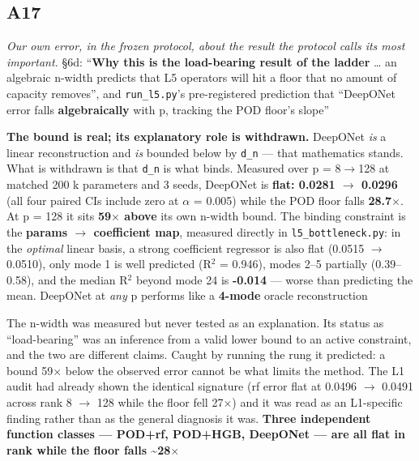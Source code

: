 \documentclass[10pt]{article}
\begin{document}
\subsection*{A17}\label{led:A17}
\begin{description}[leftmargin=0pt,itemsep=1pt]
\item[Claim withdrawn.] \emph{Our own error, in the frozen protocol, about the result the protocol calls its most important.} §6d: ``\textbf{Why this is the load-bearing result of the ladder} \ldots{} an algebraic n-width predicts that L5 operators will hit a floor that no amount of capacity removes'', and \texttt{run\_l5.py}'s pre-registered prediction that ``DeepONet error falls \textbf{algebraically} with p, tracking the POD floor's slope''
\item[Replaced with.] \textbf{The bound is real; its explanatory role is withdrawn.} DeepONet \emph{is} a linear reconstruction and \emph{is} bounded below by \texttt{d\_n} --- that mathematics stands. What is withdrawn is that \texttt{d\_n} is what binds. Measured over p = 8$\rightarrow$128 at matched 200 k parameters and 3 seeds, DeepONet is \textbf{flat: 0.0281 $\rightarrow$ 0.0296} (all four paired CIs include zero at $\alpha$ = 0.005) while the POD floor falls \textbf{28.7$\times$}. At p = 128 it sits \textbf{59$\times$ above} its own n-width bound. The binding constraint is the \textbf{params $\rightarrow$ coefficient map}, measured directly in \texttt{l5\_bottleneck.py}: in the \emph{optimal} linear basis, a strong coefficient regressor is also flat (0.0515 $\rightarrow$ 0.0510), only mode 1 is well predicted (R$^2$ = 0.946), modes 2--5 partially (0.39--0.58), and the median R$^2$ beyond mode 24 is \textbf{-0.014} --- worse than predicting the mean. DeepONet at \emph{any} p performs like a \textbf{4-mode} oracle reconstruction
\item[Why it was wrong.] The n-width was measured but never tested as an explanation. Its status as ``load-bearing'' was an inference from a valid lower bound to an active constraint, and the two are different claims. Caught by running the rung it predicted: a bound 59$\times$ below the observed error cannot be what limits the method. The L1 audit had already shown the identical signature (rf error flat at 0.0496 $\rightarrow$ 0.0491 across rank 8 $\rightarrow$ 128 while the floor fell 27$\times$) and it was read as an L1-specific finding rather than as the general diagnosis it was. \textbf{Three independent function classes --- POD+rf, POD+HGB, DeepONet --- are all flat in rank while the floor falls \textasciitilde{}28$\times$}
\end{description}
\end{document}
